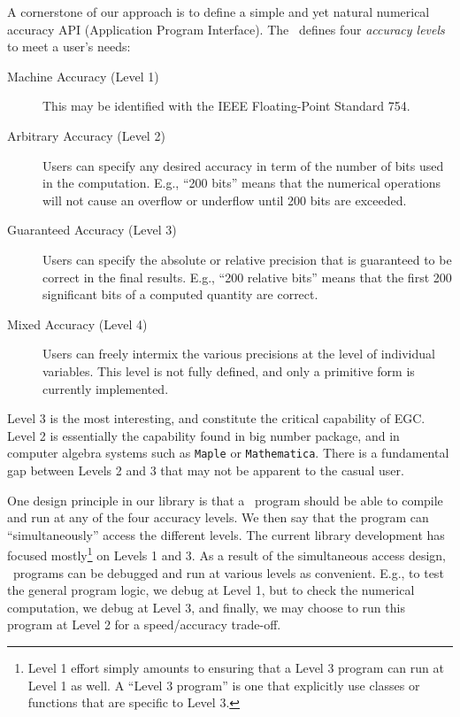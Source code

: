 \documentclass[12pt]{article}
\begin{document}
A cornerstone of our approach is 
to define a simple and yet natural numerical accuracy
API (Application Program Interface).
The \corelib\ defines four {\em accuracy levels}
to meet a user's needs: 

\begin{description}
\item[Machine Accuracy (Level 1)]
	This may be identified with the IEEE 
	Floating-Point Standard 754.
\item[Arbitrary Accuracy (Level 2)]
	Users can specify any desired 
	accuracy in term of the number of bits used in the computation. 
	E.g., ``200 bits'' means that the numerical operations will not 
	cause an overflow or underflow until 200 bits are exceeded.
\item[Guaranteed Accuracy (Level 3)]
	Users can specify the absolute 
	or relative precision that is guaranteed to be correct in the 
	final results. E.g., ``200 relative bits'' means that the first 
	200 significant bits of a computed quantity are correct.
\item[Mixed Accuracy (Level 4)]
	Users can freely intermix the various precisions at the level
	of individual variables.  This level is not fully defined,
	and only a primitive form is currently implemented.
\end{description}

Level 3 is the most interesting, and constitute the critical
capability of EGC.  Level 2 is essentially the
capability found in big number package, and in
computer algebra systems such as \texttt{Maple} or \texttt{Mathematica}.
There is a fundamental gap between Levels 2 and 3 that may not
be apparent to the casual user.

One design principle in our library is that a
\core\ program should be able to compile and run at
any of the four accuracy levels.  We then say that the program
can ``simultaneously'' access the different levels.
The current library development has focused mostly\footnote{
Level 1 effort simply amounts to ensuring
that a Level 3 program can
run at Level 1 as well.  A ``Level 3 program'' is one
that explicitly use classes or functions
that are specific to Level 3.
}
on Levels 1 and 3.  As a result of the simultaneous access
design, \core\ programs can be debugged and run at various levels
as convenient.  E.g., to test the general program logic, we
debug at Level 1, but to check the numerical computation,
we debug at Level 3, and finally, we may choose to run this
program at Level 2 for a speed/accuracy trade-off.
\end{document}

